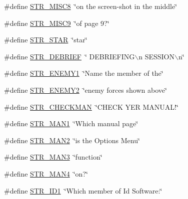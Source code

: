 \begin{DoxyCompactItemize}
\#define \hyperlink{F__SPEAR_8H_a4677fb042211782a8779029ba95e5c1a}{STR\_\-MISC8}~\char`\"{}on the screen-\/shot in the middle\char`\"{}
\item 
\#define \hyperlink{F__SPEAR_8H_aa29636566bc0856ced20ffa00608e4e7}{STR\_\-MISC9}~\char`\"{}of page 9?\char`\"{}
\item 
\#define \hyperlink{F__SPEAR_8H_a531fee0254e344c223abd9667bbef9d8}{STR\_\-STAR}~\char`\"{}star\char`\"{}
\item 
\#define \hyperlink{F__SPEAR_8H_a4c4be61357966f3ac50850fcfeadcadb}{STR\_\-DEBRIEF}~\char`\"{} DEBRIEFING$\backslash$n SESSION$\backslash$n\char`\"{}
\item 
\#define \hyperlink{F__SPEAR_8H_a43edc67ee966f8fc78d2e8c8470620ff}{STR\_\-ENEMY1}~\char`\"{}Name the member of the\char`\"{}
\item 
\#define \hyperlink{F__SPEAR_8H_a560415a9207227ba475e8f4d4aa5746e}{STR\_\-ENEMY2}~\char`\"{}enemy forces shown above\char`\"{}
\item 
\#define \hyperlink{F__SPEAR_8H_abe171a6d9c08dad95fad9031de9656b2}{STR\_\-CHECKMAN}~\char`\"{}CHECK YER MANUAL!\char`\"{}
\item 
\#define \hyperlink{F__SPEAR_8H_a9aa8488d922681c3505d651155eeba6e}{STR\_\-MAN1}~\char`\"{}Which manual page\char`\"{}
\item 
\#define \hyperlink{F__SPEAR_8H_a94b9e508d3cf324895cd52c448de24ea}{STR\_\-MAN2}~\char`\"{}is the Options Menu\char`\"{}
\item 
\#define \hyperlink{F__SPEAR_8H_a6184d9bc6aacbc7f447a79356444446c}{STR\_\-MAN3}~\char`\"{}function\char`\"{}
\item 
\#define \hyperlink{F__SPEAR_8H_a595a83a96a13036040148c4eb1044897}{STR\_\-MAN4}~\char`\"{}on?\char`\"{}
\item 
\#define \hyperlink{F__SPEAR_8H_a7dd3e220239424b42dd332e203a1e127}{STR\_\-ID1}~\char`\"{}Which member of Id Software:\char`\"{}
\end{DoxyCompactItemize}


